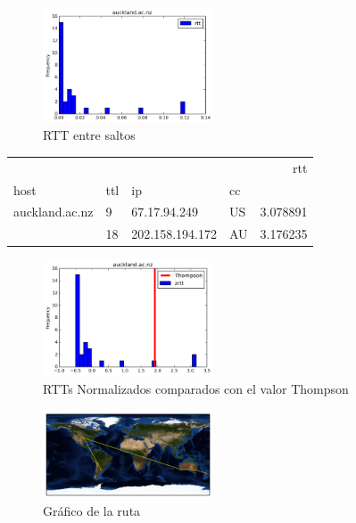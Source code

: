 \begin{figure}[H]
  \centering
    \includegraphics[width=0.45\textwidth]{histogramas_rtt/auckland-ac-nz.png}
  \caption{RTT entre saltos}
  \label{entropia-s}
\end{figure}

\begin{center}
\begin{tabular}{llllr}
\toprule
               &    &               &    &       rtt \\
host & ttl & ip & cc &           \\
\midrule
auckland.ac.nz & 9  & 67.17.94.249 & US &  3.078891 \\
               & 18 & 202.158.194.172 & AU &  3.176235 \\
\bottomrule
\end{tabular}

\end{center}

\begin{figure}[H]
  \centering
    \includegraphics[width=0.45\textwidth]{histogramas_thompson/auckland-ac-nz.png}
  \caption{RTTs Normalizados comparados con el valor Thompson}
  \label{entropia-s}
\end{figure}

\begin{figure}[H]
  \centering
    \includegraphics[width=0.45\textwidth]{grafico-rutas/auckland-ac-nz.png}
  \caption{Gráfico de la ruta}
  \label{entropia-s}
\end{figure}




